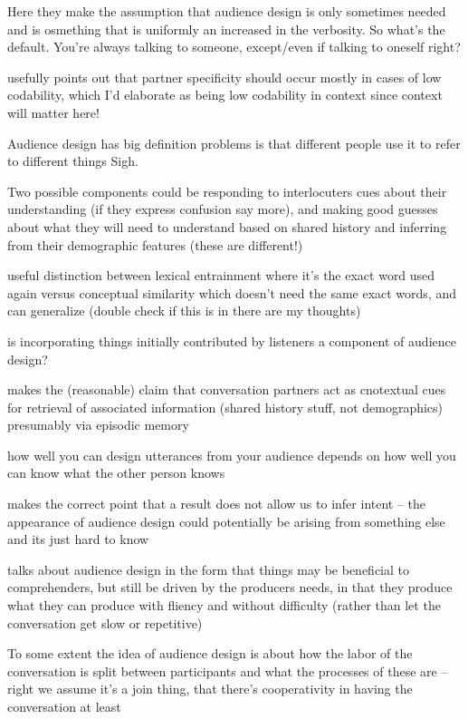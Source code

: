 \documentclass[]{article}
\begin{document}
\cite{horton2002a} Here they make the assumption that audience design is only sometimes needed and is osmething that is uniformly an increased in the verbosity. So what's the default. You're always talking to someone, except/even if talking to oneself right? 

\cite{horton2002a} usefully points out that partner specificity should occur mostly in cases of low codability, which I'd elaborate as being low codability in context since context will matter here!

Audience design has big definition problems is that different people use it to refer to different things Sigh. 

Two possible components could be  responding to interlocuters cues about their understanding (if they express confusion say more), and making good guesses about what they will need to understand based on shared history and inferring from their demographic features (these are different!) 

\cite{horton2002a} useful distinction between lexical entrainment where it's the exact word used again versus conceptual similarity which doesn't need the same exact words, and can generalize (double check if this is in there are my thoughts) 

is incorporating things initially contributed by listeners a component of audience design? 

\cite{horton2005} makes the (reasonable) claim that conversation partners act as cnotextual cues for retrieval of associated information (shared history stuff, not demographics) presumably via episodic memory 

\cite{horton2005} how well you can design utterances from your audience depends on how well you can know what the other person knows

\cite{horton1996} makes the correct point that a result does not allow us to infer intent -- the appearance of audience design could potentially be arising from something else and its just hard to know

\cite{macdonald2013} talks about audience design in the form that things may be beneficial to comprehenders, but still be driven by the producers needs, in that they produce what they can produce with fliency and without difficulty (rather than let the conversation get slow or repetitive) 

To some extent the idea of audience design is about how the labor of the conversation is split between participants and what the processes of these are -- right we assume it's a join thing, that there's cooperativity in having the conversation at least 
\end{document}
